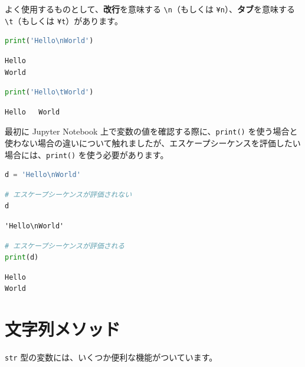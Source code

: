 よく使用するものとして、\textbf{改行}を意味する \texttt{\textbackslash{}n}（もしくは \texttt{¥n}）、\textbf{タブ}を意味する \texttt{\textbackslash{}t}（もしくは \texttt{¥t}）があります。


\begin{lstlisting}[style=codecell,language=Python]
print('Hello\nWorld')
\end{lstlisting}

\begin{lstlisting}[style=outputcell]
Hello
World
\end{lstlisting}

\begin{lstlisting}[style=codecell,language=Python]
print('Hello\tWorld')
\end{lstlisting}

\begin{lstlisting}[style=outputcell]
Hello	World
\end{lstlisting}

最初に Jupyter Notebook 上で変数の値を確認する際に、\texttt{print()} を使う場合と使わない場合の違いについて触れましたが、エスケープシーケンスを評価したい場合には、\texttt{print()} を使う必要があります。


\begin{lstlisting}[style=codecell,language=Python]
d = 'Hello\nWorld'
\end{lstlisting}

\begin{lstlisting}[style=codecell,language=Python]
# エスケープシーケンスが評価されない
d
\end{lstlisting}

\begin{lstlisting}[style=outputcell]
'Hello\nWorld'
\end{lstlisting}

\begin{lstlisting}[style=codecell,language=Python]
# エスケープシーケンスが評価される
print(d)
\end{lstlisting}

\begin{lstlisting}[style=outputcell]
Hello
World
\end{lstlisting}

\section{文字列メソッド}


\texttt{str} 型の変数には、いくつか便利な機能がついています。

